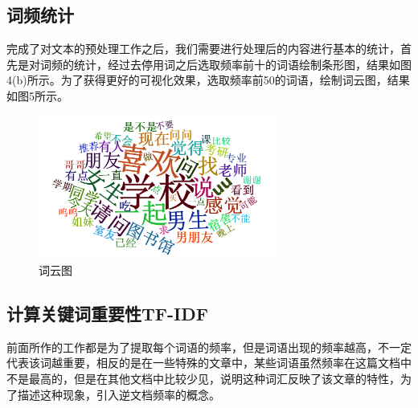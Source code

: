 \documentclass[a4paper,12pt]{ctexart}     %
\begin{document}
	\subsection{词频统计}
	
	完成了对文本的预处理工作之后，我们需要进行处理后的内容进行基本的统计，首先是对词频的统计，经过去停用词之后选取频率前十的词语绘制条形图，结果如图4(b)所示。为了获得更好的可视化效果，选取频率前50的词语，绘制词云图，结果如图5所示。

%				
%	
	
	\begin{figure}[H] %
		\centering %
		\includegraphics[width=0.7\textwidth]{词云图.png} %
		\caption{词云图} %
	\end{figure}
	
	\subsection{计算关键词重要性TF-IDF}
	前面所作的工作都是为了提取每个词语的频率，但是词语出现的频率越高，不一定代表该词越重要，相反的是在一些特殊的文章中，某些词语虽然频率在这篇文档中不是最高的，但是在其他文档中比较少见，说明这种词汇反映了该文章的特性，为了描述这种现象，引入逆文档频率的概念。
	
\end{document}
